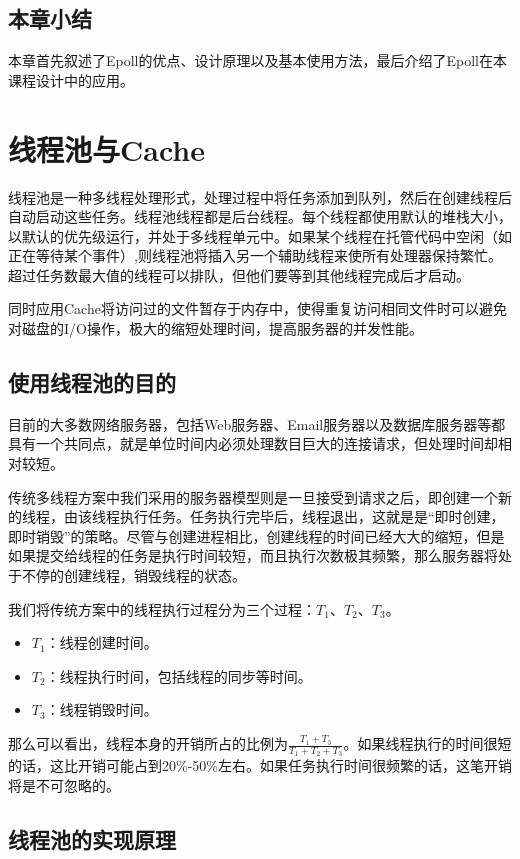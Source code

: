 \documentclass[bachelor]{thesis-uestc}
\begin{document}
\section{本章小结}
本章首先叙述了Epoll的优点、设计原理以及基本使用方法，最后介绍了Epoll在本课程设计中的应用。

\chapter{线程池与Cache}
线程池是一种多线程处理形式，处理过程中将任务添加到队列，然后在创建线程后自动启动这些任务。线程池线程都是后台线程。每个线程都使用默认的堆栈大小，以默认的优先级运行，并处于多线程单元中。如果某个线程在托管代码中空闲（如正在等待某个事件）,则线程池将插入另一个辅助线程来使所有处理器保持繁忙。超过任务数最大值的线程可以排队，但他们要等到其他线程完成后才启动。

同时应用Cache将访问过的文件暂存于内存中，使得重复访问相同文件时可以避免对磁盘的I/O操作，极大的缩短处理时间，提高服务器的并发性能。

\section{使用线程池的目的}
目前的大多数网络服务器，包括Web服务器、Email服务器以及数据库服务器等都具有一个共同点，就是单位时间内必须处理数目巨大的连接请求，但处理时间却相对较短。 

传统多线程方案中我们采用的服务器模型则是一旦接受到请求之后，即创建一个新的线程，由该线程执行任务。任务执行完毕后，线程退出，这就是是“即时创建，即时销毁”的策略。尽管与创建进程相比，创建线程的时间已经大大的缩短，但是如果提交给线程的任务是执行时间较短，而且执行次数极其频繁，那么服务器将处于不停的创建线程，销毁线程的状态。

我们将传统方案中的线程执行过程分为三个过程：$T_1$、$T_2$、$T_3$。
\begin{itemize}
	\item $T_1$：线程创建时间。 
	\item $T_2$：线程执行时间，包括线程的同步等时间。 
	\item $T_3$：线程销毁时间。
\end{itemize}

那么可以看出，线程本身的开销所占的比例为$\frac{T_1+T_3}{T_1+T_2+T_3}$。如果线程执行的时间很短的话，这比开销可能占到20\%-50\%左右。如果任务执行时间很频繁的话，这笔开销将是不可忽略的。

\section{线程池的实现原理}
\end{document}
